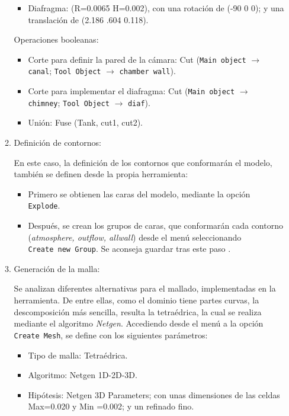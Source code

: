 \begin{itemize}
\begin{enumerate}
    \begin{itemize}
    \item
      Diafragma: (R=0.0065 H=0.002), con una rotación de (-90 0 0); y
      una translación de (2.186 .604 0.118).
    \end{itemize}

    Operaciones booleanas:

    \begin{itemize}
    \item
      Corte para definir la pared de la cámara: Cut (\texttt{Main object} $\to$ \texttt{canal};
      \texttt{Tool Object} $\to$ \texttt{chamber wall}).
    \item
      Corte para implementar el diafragma: Cut (\texttt{Main object} $\to$ \texttt{chimney}; \texttt{Tool Object} $\to$ \texttt{diaf}).
    \item
      Unión: Fuse (Tank, cut1, cut2).
    \end{itemize}

  \item
    Definición de contornos:

    En este caso, la definición de los contornos que conformarán el
    modelo, también se definen desde la propia herramienta:

    \begin{itemize}
    \item
      Primero se obtienen las caras del modelo, mediante la opción
      \texttt{Explode}.
    \item
      Después, se crean los grupos de caras, que conformarán cada
      contorno (\emph{atmosphere, outflow, allwall}) desde el menú
      seleccionando \texttt{Create\ new\ Group}. Se aconseja guardar
      tras este paso .
    \end{itemize}
  \item
    Generación de la malla:

    Se analizan diferentes alternativas para el mallado, implementadas
    en la herramienta. De entre ellas, como el dominio tiene partes
    curvas, la descomposición más sencilla, resulta la tetraédrica, la
    cual se realiza mediante el algoritmo \emph{Netgen}. Accediendo
    desde el menú a la opción \texttt{Create\ Mesh}, se define con los
    siguientes parámetros:

    \begin{itemize}
    \item
      Tipo de malla: Tetraédrica.
    \item
      Algoritmo: Netgen 1D-2D-3D.
    \item
      Hipótesis: Netgen 3D Parameters; con unas dimensiones de las
      celdas Max=0.020 y Min =0.002; y un refinado fino.
    \end{itemize}


\end{enumerate}
\end{itemize}
